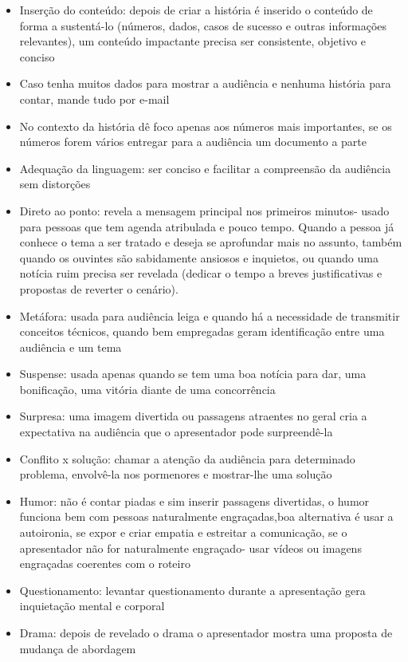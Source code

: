 \begin{itemize}
    \item Inserção do conteúdo: depois de criar a história é inserido o conteúdo de forma a sustentá-lo (números, dados, casos de sucesso e outras informações relevantes), um conteúdo impactante precisa ser consistente, objetivo e conciso
    \item Caso tenha muitos dados para mostrar a audiência e nenhuma história para contar, mande tudo por e-mail
    \item No contexto da história dê foco apenas aos números mais importantes, se os números forem vários entregar para a audiência um documento a parte
    \item Adequação da linguagem: ser conciso e facilitar a compreensão da audiência sem distorções
    \item Direto ao ponto: revela a mensagem principal nos primeiros minutos- usado para pessoas que tem agenda atribulada e pouco tempo. Quando a pessoa já conhece o tema a ser tratado e deseja se aprofundar mais no assunto, também quando os ouvintes são sabidamente ansiosos e inquietos, ou quando uma notícia ruim precisa ser revelada (dedicar o tempo a breves justificativas e propostas de reverter o cenário).
    \item Metáfora: usada para audiência leiga e quando há a necessidade de transmitir conceitos técnicos, quando bem empregadas geram identificação entre uma audiência e um tema
    \item Suspense: usada apenas quando se tem uma boa notícia para dar, uma bonificação, uma vitória diante de uma concorrência
    \item Surpresa: uma imagem divertida ou passagens atraentes no geral cria a expectativa na audiência que o apresentador pode surpreendê-la
    \item Conflito x solução: chamar a atenção da audiência para determinado problema, envolvê-la nos pormenores e mostrar-lhe uma solução
    \item Humor: não é contar piadas e sim inserir passagens divertidas, o humor funciona bem com pessoas naturalmente engraçadas,boa alternativa é usar a autoironia, se expor e criar empatia e estreitar a comunicação, se o apresentador não for naturalmente engraçado- usar vídeos ou imagens engraçadas coerentes com o roteiro
    \item Questionamento: levantar questionamento durante a apresentação gera inquietação mental e corporal
    \item Drama: depois de revelado o drama o apresentador mostra uma proposta de mudança de abordagem

\end{itemize}
